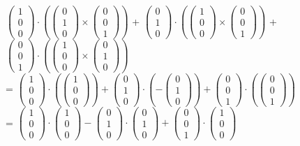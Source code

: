 \documentclass[12pt]{article}
\newcommand{\myvec}[1]{\ensuremath{\begin{pmatrix}#1\end{pmatrix}}}
\begin{document}
\begin{center} 
$\myvec{1\\0\\0}\cdot (\myvec{0\\1\\0} \times \myvec{0\\0\\1})$  + $\myvec{0\\1\\0} \cdot (\myvec{1\\0\\0} \times \myvec{0\\0\\1})$ + $\myvec{0\\0\\1} \cdot (\myvec{1\\0\\0} \times \myvec{0\\1\\0} )$ \\
= $\myvec{1\\0\\0} \cdot (\myvec{1\\0\\0}) + \myvec{0\\1\\0} \cdot (-\myvec{0\\1\\0}) + \myvec{0\\0\\1} \cdot (\myvec{0\\0\\1})$ \\
= $\myvec{1\\0\\0} \cdot \myvec{1\\0\\0} - \myvec{0\\1\\0} \cdot \myvec{0\\1\\0} + \myvec{0\\0\\1} \cdot \myvec{1\\0\\0}$ \\
\end{center}
\end{document}
